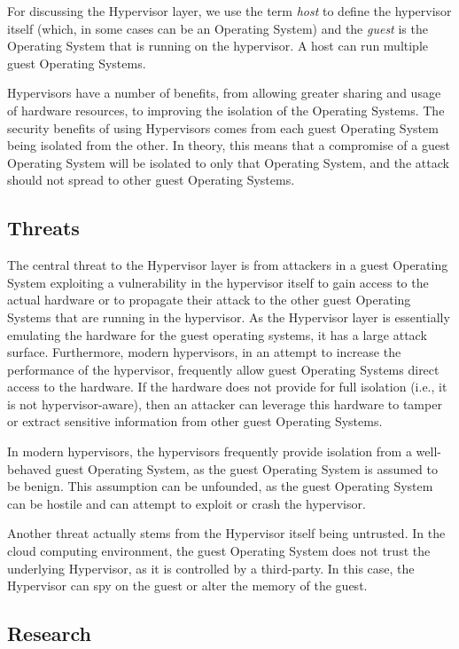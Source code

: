 \documentclass[11pt,letterpaper]{article}
\begin{document}
For discussing the Hypervisor layer, we use the term \emph{host} to
define the hypervisor itself (which, in some cases can be an Operating
System) and the \emph{guest} is the Operating System that is running
on the hypervisor. A host can run multiple guest Operating Systems.

Hypervisors have a number of benefits, from allowing greater sharing
and usage of hardware resources, to improving the isolation of the
Operating Systems. The security benefits of using Hypervisors comes
from each guest Operating System being isolated from the other. In
theory, this means that a compromise of a guest Operating System will
be isolated to only that Operating System, and the attack should not
spread to other guest Operating Systems.

\subsection{Threats}

The central threat to the Hypervisor layer is from attackers in a
guest Operating System exploiting a vulnerability in the hypervisor
itself to gain access to the actual hardware or to propagate their
attack to the other guest Operating Systems that are running in the
hypervisor. As the Hypervisor layer is essentially emulating the
hardware for the guest operating systems, it has a large attack
surface. Furthermore, modern hypervisors, in an attempt to increase
the performance of the hypervisor, frequently allow guest Operating
Systems direct access to the hardware. If the hardware does not
provide for full isolation (i.e., it is not hypervisor-aware), then an
attacker can leverage this hardware to tamper or extract sensitive
information from other guest Operating Systems.

In modern hypervisors, the hypervisors frequently provide isolation
from a well-behaved guest Operating System, as the guest Operating
System is assumed to be benign. This assumption can be unfounded, as
the guest Operating System can be hostile and can attempt to exploit
or crash the hypervisor. 

Another threat actually stems from the Hypervisor itself being
untrusted. In the cloud computing environment, the guest Operating
System does not trust the underlying Hypervisor, as it is controlled
by a third-party. In this case, the Hypervisor can spy on the guest
or alter the memory of the guest.

\subsection{Research}
\end{document}
